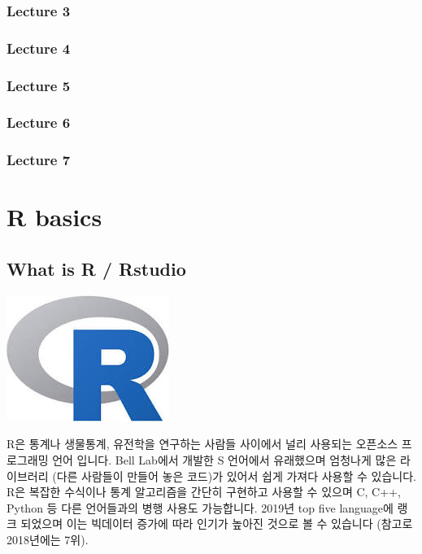 \documentclass[
]{book}
\begin{document}
\hypertarget{lecture-3}{%
\subsection{Lecture 3}\label{lecture-3}}

\hypertarget{lecture-4}{%
\subsection{Lecture 4}\label{lecture-4}}

\hypertarget{lecture-5}{%
\subsection{Lecture 5}\label{lecture-5}}

\hypertarget{lecture-6}{%
\subsection{Lecture 6}\label{lecture-6}}

\hypertarget{lecture-7}{%
\subsection{Lecture 7}\label{lecture-7}}

\hypertarget{r-basics}{%
\chapter{R basics}\label{r-basics}}

\hypertarget{what-is-r-rstudio}{%
\section{What is R / Rstudio}\label{what-is-r-rstudio}}

\includegraphics{images/01/r.jpg}

R은 통계나 생물통계, 유전학을 연구하는 사람들 사이에서 널리 사용되는 오픈소스 프로그래밍 언어 입니다. Bell Lab에서 개발한 S 언어에서 유래했으며 엄청나게 많은 라이브러리 (다른 사람들이 만들어 놓은 코드)가 있어서 쉽게 가져다 사용할 수 있습니다. R은 복잡한 수식이나 통계 알고리즘을 간단히 구현하고 사용할 수 있으며 C, C++, Python 등 다른 언어들과의 병행 사용도 가능합니다. 2019년 top five language에 랭크 되었으며 이는 빅데이터 증가에 따라 인기가 높아진 것으로 볼 수 있습니다 (참고로 2018년에는 7위).
\end{document}
